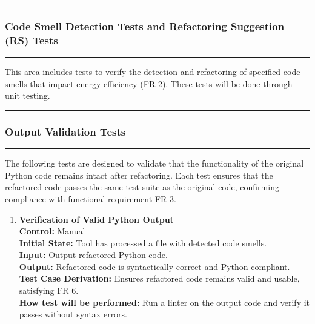 \documentclass[12pt, titlepage]{article}
\newcommand{\colorrule}{\textcolor{BlueViolet}{\rule{\linewidth}{2pt}}}
\begin{document}
\begin{enumerate}[label={\bf
    \textcolor{Maroon}{test-FR-IA-\arabic*}}, wide=0pt, font=\itshape]
    \noindent
    \colorrule

    \subsubsection{Code Smell Detection Tests and Refactoring
    Suggestion (RS) Tests} \label{4.1.2}
    \colorrule

    \medskip

    \noindent
    This area includes tests to verify the detection and refactoring
    of specified code
    smells that impact energy efficiency (FR 2). These tests will be
    done through unit testing.

\end{enumerate}

\noindent
\colorrule

\subsubsection{Output Validation Tests}
\colorrule

\medskip

\noindent
The following tests are designed to validate that the functionality
of the original Python code remains intact after refactoring. Each
test ensures that the refactored code passes the same test suite as
the original code, confirming compliance with functional requirement FR 3.

\begin{enumerate}[label={\bf
    \textcolor{Maroon}{test-FR-OV-\arabic*}}, wide=0pt, font=\itshape]
    \label{itm:FR-OV-1}
  \item \textbf{Verification of Valid Python Output}\\[2mm]
    \textbf{Control:} Manual \\
    \textbf{Initial State:} Tool has processed a file with detected
    code smells.\\
    \textbf{Input:} Output refactored Python code.\\
    \textbf{Output:} Refactored code is syntactically correct and
    Python-compliant.\\[2mm]
    \textbf{Test Case Derivation:} Ensures refactored code remains
    valid and usable, satisfying FR 6.\\[2mm]
    \textbf{How test will be performed:} Run a linter on the output
    code and verify it passes without syntax errors.

\end{enumerate}
\end{document}
